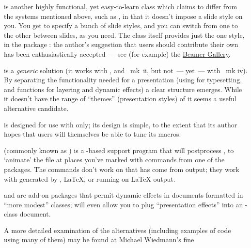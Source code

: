  is another highly functional, yet easy-to-learn class
which claims to differ from the systems mentioned above, such as
, in that it doesn't impose a slide style on you.  You
get to specify a bunch of slide styles, and you can switch from one to
the other between slides, as you need.  The class itself provides
just the one style, in the package : the author's
suggestion that users should contribute their own has been
enthusiastically accepted~--- see (for example) the %
\href{http://deic.uab.es/~iblanes/beamer_gallery/}{Beamer Gallery}.

 is a \emph{generic} solution (it works with
\plaintex{}, \latex{} and \context{}~mk~ii, but not~--- yet~--- with
\context{}~mk iv).  By separating the functionality needed for a
presentation (using \tex{} for typesetting, and  functions
for layering and dynamic effects) a clear structure emerges.  While it
doesn't have the range of ``themes'' (presentation styles) of
 it seems a useful alternative candidate.

 is designed for use with \plaintex{} only; its
design is simple, to the extent that its author hopes that users will
themselves be able to tune its macros.

 (commonly known as ) is a
-based support program that will postprocess
, to `animate' the file at places you've marked with
commands from one of the  packages.  The commands don't
work on  that has come from  output; they
work with  generated by \PDFLaTeX{}, \LaTeX{}, or
 running on \LaTeX{} output.

 and  are add-on packages that
permit dynamic effects in documents formatted in ``more modest''
classes;  will even allow you to plug
``presentation effects'' into an -class document.


A more detailed examination of the alternatives (including examples
of code using many of them) may be found at Michael Wiedmann's fine

